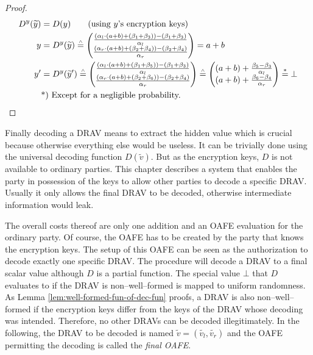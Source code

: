 \begin{proof}
  \begin{align*}
    D^y(\widetilde{y}) &= D(y) \qquad\text{(using $y$'s encryption keys)}\\
    y &= D^y(\widetilde{y}) \stackrel{\scriptscriptstyle\wedge}{=}
    \begin{pmatrix}
      \frac{(\alpha_l \cdot (a+b) + (\beta_1 + \beta_3)) - (\beta_1+\beta_3)}
           {\alpha_l}\\
      \frac{(\alpha_r \cdot (a+b) + (\beta_2 + \beta_4)) - (\beta_2+\beta_4)}
           {\alpha_r}\\
    \end{pmatrix}
    = a+b\\
    y' &= D^y(\widetilde{y}')
    \stackrel{\scriptscriptstyle\wedge}{=}
    \begin{pmatrix}
      \frac{(\alpha_l \cdot (a+b) + (\beta_1 + \beta_5)) - (\beta_1+\beta_3)}
           {\alpha_l}\\
      \frac{(\alpha_r \cdot (a+b) + (\beta_2 + \beta_6)) - (\beta_2+\beta_4)}
           {\alpha_r}\\
    \end{pmatrix}
    \stackrel{\scriptscriptstyle\wedge}{=}
    \begin{pmatrix}
      (a+b) +
      \frac{\beta_5 - \beta_3}{\alpha_l}\\
      (a+b) +
      \frac{\beta_6 - \beta_4}{\alpha_r}\\
    \end{pmatrix}
    \stackrel{*}{=} \bot\\
    &\text{*) Except for a negligible probability.}{}
  \end{align*}
\end{proof}


\label{sec:drav-final-decoding}

Finally decoding a DRAV means to extract the hidden value which is crucial
because otherwise everything else would be useless. It can be trivially done
using the universal decoding function $D(\widetilde{v})$. But as the encryption
keys, $D$ is not available to ordinary parties. This chapter describes a system
that enables the party in possession of the keys to allow other parties to
decode a specific DRAV\@. Usually it only allows the final DRAV to be decoded,
otherwise intermediate information would leak.

The overall costs thereof are only one addition and an OAFE evaluation for the
ordinary party. Of course, the OAFE has to be created by the party that knows
the encryption keys. The setup of this OAFE can be seen as the authorization to
decode exactly one specific DRAV\@. The procedure will decode a DRAV to a final
scalar value although $D$ is a partial function. The special value $\bot$ that
$D$ evaluates to if the DRAV is non--well--formed is mapped to uniform
randomness. As Lemma \ref{lem:well-formed-fun-of-dec-fun} proofs, a DRAV is
also non--well--formed if the encryption keys differ from the keys of the DRAV
whose decoding was intended. Therefore, no other DRAVs can be decoded
illegitimately. In the following, the DRAV to be decoded is named $\widetilde{v}
= (\widetilde{v_l}, \widetilde{v_r})$ and the OAFE permitting the decoding is
called the \emph{final OAFE}.

